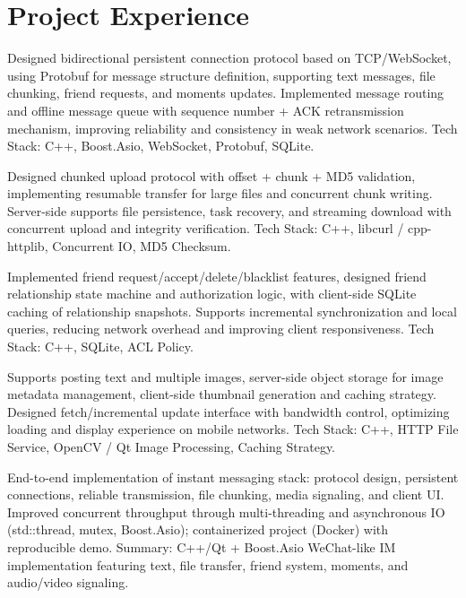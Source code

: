 \documentclass{resume_en}
\begin{document}
\section{Project Experience}


\Content
{Designed bidirectional persistent connection protocol based on TCP/WebSocket, using Protobuf for message structure definition, supporting text messages, file chunking, friend requests, and moments updates.}
{Implemented message routing and offline message queue with sequence number + ACK retransmission mechanism, improving reliability and consistency in weak network scenarios.}
{Tech Stack: C++, Boost.Asio, WebSocket, Protobuf, SQLite.}

\Content
{Designed chunked upload protocol with offset + chunk + MD5 validation, implementing resumable transfer for large files and concurrent chunk writing.}
{Server-side supports file persistence, task recovery, and streaming download with concurrent upload and integrity verification.}
{Tech Stack: C++, libcurl / cpp-httplib, Concurrent IO, MD5 Checksum.}

\Content
{Implemented friend request/accept/delete/blacklist features, designed friend relationship state machine and authorization logic, with client-side SQLite caching of relationship snapshots.}
{Supports incremental synchronization and local queries, reducing network overhead and improving client responsiveness.}
{Tech Stack: C++, SQLite, ACL Policy.}

\Content
{Supports posting text and multiple images, server-side object storage for image metadata management, client-side thumbnail generation and caching strategy.}
{Designed fetch/incremental update interface with bandwidth control, optimizing loading and display experience on mobile networks.}
{Tech Stack: C++, HTTP File Service, OpenCV / Qt Image Processing, Caching Strategy.}

\Content
{End-to-end implementation of instant messaging stack: protocol design, persistent connections, reliable transmission, file chunking, media signaling, and client UI.}
{Improved concurrent throughput through multi-threading and asynchronous IO (std::thread, mutex, Boost.Asio); containerized project (Docker) with reproducible demo.}
{Summary: C++/Qt + Boost.Asio WeChat-like IM implementation featuring text, file transfer, friend system, moments, and audio/video signaling.}
\end{document}
